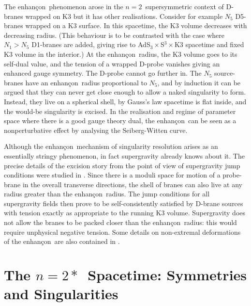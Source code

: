 \documentclass[a4paper,12pt]{amsproc}
\numberwithin{equation}{section}
\def\enh{enhan\c con}
\def\net{$n{=}2$}
\def\nets{$n{=}2*$}
\begin{document}
The \enh\ phenomenon \cite{jpp} arose in the \net\ supersymmetric
context of D-branes wrapped on K3 but it has other realisations.
Consider for example $N_5$ D5-branes wrapped on a K3 surface.  In this
spacetime, the K3 volume decreases with decreasing radius.  (This
behaviour is to be contrasted with the case where $N_1>N_5$ D1-branes
are added, giving rise to AdS$_3\times$S$^3\times$K3 spacetime and
fixed K3 volume in the interior.)  At the \enh\ radius, the K3 volume
goes to its self-dual value, and the tension of a wrapped D-probe
vanishes giving an enhanced gauge symmetry.  The D-probe cannot go
further in.  The $N_5$ source-branes have an \enh\ radius proportional
to $N_5$, and by induction it can be argued that they can never get
close enough to allow a naked singularity to form.  Instead, they live
on a spherical shell, by Gauss's law spacetime is flat inside, and the
would-be singularity is excised.  In the realisation and regime of
parameter space where there is a good gauge theory dual, the \enh\ can
be seen as a nonperturbative effect by analysing the Seiberg-Witten
curve.

Although the \enh\ mechanism of singularity resolution arises as an
essentially stringy phenomenon, in fact supergravity already knows
about it.  The precise details of the excision story from the point of
view of supergravity jump conditions were studied in \cite{jmpr}.
Since there is a moduli space for motion of a probe-brane in the
overall transverse directions, the shell of branes can also live at
any radius greater than the \enh\ radius.  The jump conditions for all
supergravity fields then prove to be self-consistently satisfied by
D-brane sources with tension exactly as appropriate to the running K3
volume.  Supergravity does not allow the branes to be packed closer
than the \enh\ radius: this would require unphysical negative tension.
Some details on non-extremal deformations of the \enh\ are also
contained in \cite{jmpr}.

\section{The  \nets\ Spacetime: Symmetries and Singularities}
\end{document}
